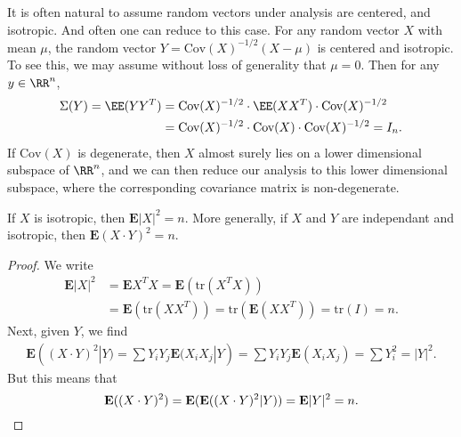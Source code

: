 It is often natural to assume random vectors under analysis are centered, and isotropic. And often one can reduce to this case. For any random vector $X$ with mean $\mu$, the random vector $Y = \text{Cov}(X)^{-1/2}(X - \mu)$ is centered and isotropic. To see this, we may assume without loss of generality that $\mu = 0$. Then for any $y \in \RR^n$,
%
\begin{align*}
	\Sigma(Y) = \EE(Y Y^T) &= \text{Cov}(X)^{-1/2} \cdot \EE(X X^T) \cdot \text{Cov}(X)^{-1/2}\\
	&= \text{Cov}(X)^{-1/2} \cdot \text{Cov}(X) \cdot \text{Cov}(X)^{-1/2} = I_n.
\end{align*}
%
If $\text{Cov}(X)$ is degenerate, then $X$ almost surely lies on a lower dimensional subspace of $\RR^n$, and we can then reduce our analysis to this lower dimensional subspace, where the corresponding covariance matrix is non-degenerate.

%
%

\begin{lemma}
    If $X$ is isotropic, then $\mathbf{E} |X|^2 = n$. More generally, if $X$ and $Y$ are independant and isotropic, then $\mathbf{E}(X \cdot Y)^2 = n$.
\end{lemma}
\begin{proof}
    We write
    \begin{align*}
        \mathbf{E} |X|^2 &= \mathbf{E} X^T X = \mathbf{E} \left( \text{tr}(X^T X) \right)\\
        &= \mathbf{E} \left( \text{tr}(XX^T) \right) = \text{tr}(\mathbf{E}(XX^T)) = \text{tr}(I) = n.
    \end{align*}
    Next, given $Y$, we find
    \begin{align*}
        \mathbf{E}((X \cdot Y)^2 | Y) = \sum Y_iY_j \mathbf{E}(X_iX_j|Y) = \sum Y_iY_j \mathbf{E}(X_iX_j) = \sum Y_i^2 = |Y|^2.
    \end{align*}
    But this means that
    \[ \mathbf{E}((X \cdot Y)^2) = \mathbf{E}(\mathbf{E}((X \cdot Y)^2 | Y)) = \mathbf{E} |Y|^2 = n. \qedhere \]
\end{proof}

